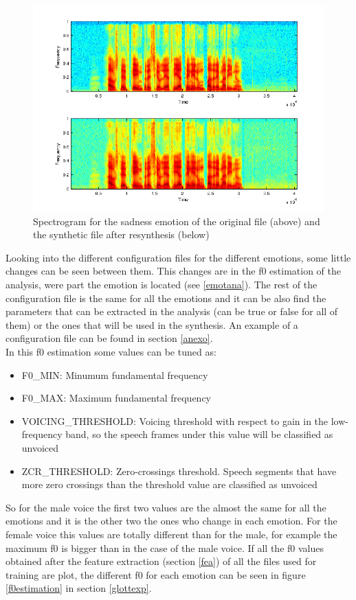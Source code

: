 \begin{figure}[!htb]
	\begin{center}
	\includegraphics[width=1\textwidth]{img/spectro-sad.png}
	\end{center}
	\caption{\label{sadspec}Spectrogram for the sadness emotion of the original file (above) and the synthetic file after resynthesis (below)}
\end{figure}
Looking into the different configuration files for the different emotions, some little changes can be seen between them. This changes are in the f0 estimation of the analysis, were part the emotion is located (see \ref{emotana}). The rest of the configuration file is the same for all the emotions and it can be also find the parameters that can be extracted in the analysis (can be true or false for all of them) or the ones that will be used in the synthesis. An example of a configuration file can be found in section \ref{anexo}.\\
In this f0 estimation some values can be tuned as:
\begin{itemize}
\item F0\_MIN: Minumum fundamental frequency
\item F0\_MAX: Maximum fundamental frequency
\item VOICING\_THRESHOLD: Voicing threshold with respect to gain in the low-frequency band, so the speech frames under this value will be classified as unvoiced
\item ZCR\_THRESHOLD: Zero-crossings threshold. Speech segments that have more zero crossings than the threshold value are classified as unvoiced
\end{itemize}
So for the male voice the first two values are the almost the same for all the emotions and it is the other two the ones who change in each emotion.
For the female voice this values are totally different than for the male, for example the maximum f0 is bigger than in the case of the male voice.
If all the f0 values obtained after the feature extraction (section \ref{fea}) of all the files used for training are plot, the different f0 for each emotion can be seen in figure \ref{f0estimation} in section \ref{glottexp}.
